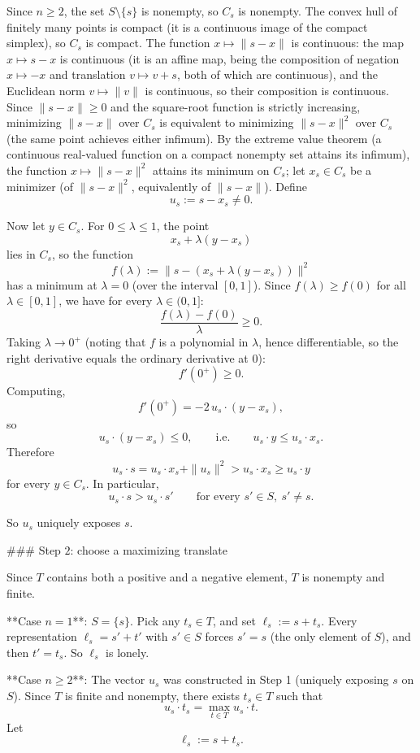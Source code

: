 Since \(n\ge 2\), the set \(S\setminus\{s\}\) is nonempty, so \(C_s\) is nonempty. The convex hull of finitely many points is compact (it is a continuous image of the compact simplex), so \(C_s\) is compact. The function \(x\mapsto\|s-x\|\) is continuous: the map \(x\mapsto s-x\) is continuous (it is an affine map, being the composition of negation \(x\mapsto -x\) and translation \(v\mapsto v+s\), both of which are continuous), and the Euclidean norm \(v\mapsto\|v\|\) is continuous, so their composition is continuous. Since \(\|s-x\|\ge 0\) and the square-root function is strictly increasing, minimizing \(\|s-x\|\) over \(C_s\) is equivalent to minimizing \(\|s-x\|^2\) over \(C_s\) (the same point achieves either infimum). By the extreme value theorem (a continuous real-valued function on a compact nonempty set attains its infimum), the function \(x\mapsto\|s-x\|^2\) attains its minimum on \(C_s\); let \(x_s\in C_s\) be a minimizer (of \(\|s-x\|^2\), equivalently of \(\|s-x\|\)). Define
\[
u_s:=s-x_s\neq 0.
\]

Now let \(y\in C_s\). For \(0\le \lambda\le 1\), the point
\[
x_s+\lambda (y-x_s)
\]
lies in \(C_s\), so the function
\[
f(\lambda):=\|s-(x_s+\lambda(y-x_s))\|^2
\]
has a minimum at \(\lambda=0\) (over the interval \([0,1]\)). Since \(f(\lambda)\ge f(0)\) for all \(\lambda\in[0,1]\), we have for every \(\lambda\in(0,1]\):
\[
\frac{f(\lambda)-f(0)}{\lambda}\ge 0.
\]
Taking \(\lambda\to 0^+\) (noting that \(f\) is a polynomial in \(\lambda\), hence differentiable, so the right derivative equals the ordinary derivative at \(0\)):
\[
f'(0^+)\ge 0.
\]
Computing,
\[
f'(0^+)=-2\,u_s\cdot (y-x_s),
\]
so
\[
u_s\cdot (y-x_s)\le 0,
\qquad\text{i.e.}\qquad
u_s\cdot y\le u_s\cdot x_s.
\]
Therefore
\[
u_s\cdot s
=
u_s\cdot x_s+\|u_s\|^2
>
u_s\cdot x_s
\ge
u_s\cdot y
\]
for every \(y\in C_s\). In particular,
\[
u_s\cdot s>u_s\cdot s'
\qquad\text{for every } s'\in S,\ s'\neq s.
\]

So \(u_s\) uniquely exposes \(s\).

### Step \(2\): choose a maximizing translate

Since \(T\) contains both a positive and a negative element, \(T\) is nonempty and finite.

**Case \(n=1\)**: \(S=\{s\}\). Pick any \(t_s\in T\), and set \(\ell_s:=s+t_s\). Every representation \(\ell_s=s'+t'\) with \(s'\in S\) forces \(s'=s\) (the only element of \(S\)), and then \(t'=t_s\). So \(\ell_s\) is lonely.

**Case \(n\ge 2\)**: The vector \(u_s\) was constructed in Step 1 (uniquely exposing \(s\) on \(S\)). Since \(T\) is finite and nonempty, there exists \(t_s\in T\) such that
\[
u_s\cdot t_s=\max_{t\in T} u_s\cdot t.
\]
Let
\[
\ell_s:=s+t_s.
\]


